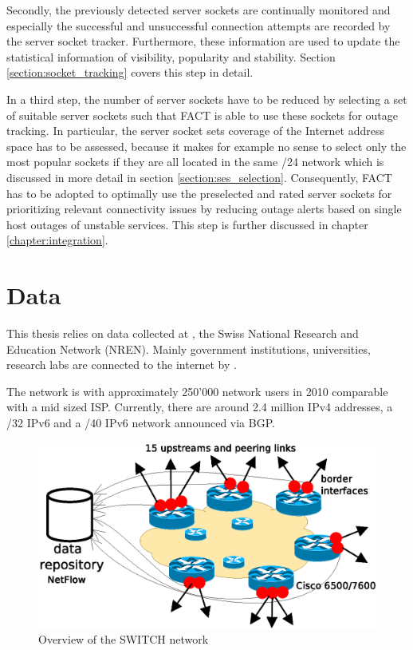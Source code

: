 Secondly, the previously detected server sockets are continually monitored and
especially the successful and unsuccessful connection attempts are recorded by
the server socket tracker.
Furthermore, these information are used to update the statistical information of
visibility, popularity and stability. Section \ref{section:socket_tracking}
covers this step in detail.

In a third step, the number of server sockets have to be reduced by selecting a 
set of suitable server sockets such that FACT is able to use these sockets for 
outage tracking. In particular, the server socket sets coverage of the Internet 
address space has to be assessed, because it makes for example no sense to 
select only the most popular sockets if they are all located in the same /24 
network which is discussed in more detail in section \ref{section:ses_selection}. Consequently, FACT has to be adopted to optimally use the preselected 
and rated server sockets for prioritizing relevant connectivity issues by 
reducing outage alerts based on single host outages of unstable services. This step is further discussed in chapter \ref{chapter:integration}.

\section{Data
\label{section:data}}

This thesis relies on data collected at \citet{switch}, the Swiss National 
Research and Education Network (NREN). Mainly government institutions, 
universities, research labs are connected to the internet by \citet{switch}\citep{Schatzmann:Mining}.

The \citet{switch} network is with approximately 250'000 network users in 2010 comparable with a mid sized ISP. Currently, there are around 2.4 million IPv4 addresses, a /32 IPv6 and a /40 IPv6 network announced via BGP\citep{Schatzmann:Tracing}.

\begin{figure}[b] 
	\centering
	\includegraphics[width=12cm]{images/network_overview.eps}
	\caption{Overview of the SWITCH network \citep{SchatzmanThesis2012}} 
	\label{fig:switch_nework}
\end{figure}

